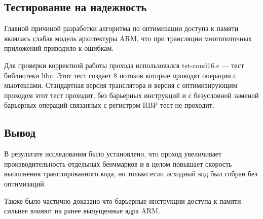 \subsection{Тестирование на надежность}

Главной причиной разработки алгоритма по оптимизации доступа к памяти являлась слабая модель архитектуры ARM, что при трансляции многопоточных приложений приводило к ошибкам.

Для проверки корректной работы прохода использовался tst-cond16.c --- тест библиотеки libc. Этот тест создает 8 потоков которые проводят операции с мьютексами. Стандартная версия транслятора и версия с оптимизирующим проходом этот тест проходит, без барьерных инструкций и с безусловной заменой барьерных операций связанных с регистром RBP тест не проходит.

\subsection{Вывод}

В результате исследования было установлено, что проход увеличивает производительность отдельных бенчмарков и в целом повышает скорость выполнения транслированного кода, но только если исходный код был собран без оптимизаций.

Также было частично доказано что барьерные инструкции доступа к памяти сильнее влияют на ранее выпущенные ядра ARM.
